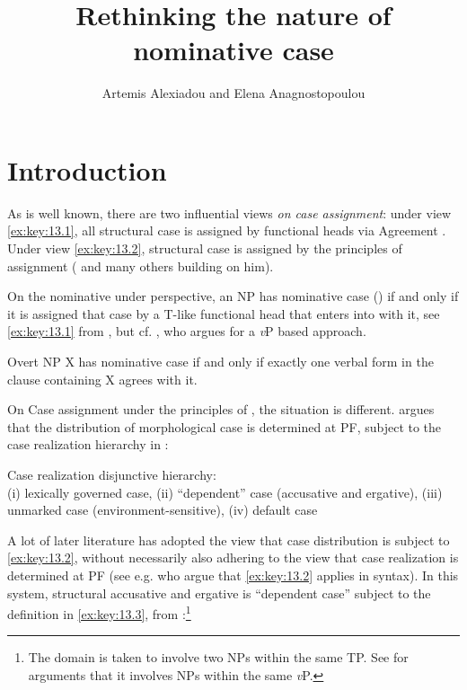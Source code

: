 \documentclass[output=paper]{langsci/langscibook}
\author{Artemis Alexiadou\affiliation{Humboldt Universität zu
    Berlin;Leibniz-Zentrum Allgemeine Sprachwissenschaft} and Elena
Anagnostopoulou\affiliation{University of Crete}}
\title{Rethinking the nature of nominative case}
\begin{document}
\glsresetall
\maketitle

\section{Introduction}

As is well known, there are two influential views \emph{on case assignment}:
under view \eqref{ex:key:13.1}, all structural case is assigned by functional
heads via Agreement \citep{Chomsky2001}. Under view \eqref{ex:key:13.2},
structural case is assigned by the principles of  assignment
(\citealt{Marantz1991} and many others building on him).

On the nominative under  perspective, an NP has nominative case (\Nom) if
and only if it is assigned that case by a T-like functional head that enters
into  with it, see \eqref{ex:key:13.1} from \citet{Baker2015}, but cf.
\textcite{Sigurdsson2000}, who argues for a \emph{v}P based approach.

\ea\label{ex:key:13.1} Overt NP X has nominative case if and only if exactly
    one verbal form in the clause containing X agrees with it.
\z

On Case assignment under the principles of , the situation is
different. \citet{Marantz1991} argues that the distribution of morphological
case is determined at PF, subject to the case realization hierarchy in
:

\ea%
    \label{ex:key:13.2} Case realization disjunctive hierarchy:\\
    (i) lexically governed case, (ii) \enquote{dependent} case (accusative and
    ergative), (iii) unmarked case (environment-sensitive), (iv) default case
\z

A lot of later literature has adopted the view that case distribution is
subject to \eqref{ex:key:13.2}, without necessarily also adhering to the view
that case realization is determined at PF (see e.g.
\citealt{Preminger2014,Baker2015} who argue that \eqref{ex:key:13.2} applies in
syntax). In this system, structural accusative and ergative is “dependent case”
subject to the definition in \eqref{ex:key:13.3}, from
\citet[74]{Baker2015}:\footnote{The domain is taken to involve two NPs within
    the same TP. See \citet{Schafer2012} for arguments that it involves NPs
within the same \emph{v}P.}
\end{document}
